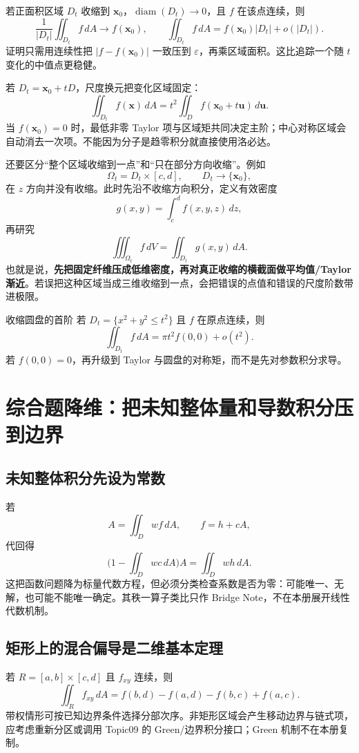 \documentclass[11pt,a4paper,fontset=fandol]{ctexart}
\begin{document}
若正面积区域 $D_t$ 收缩到 $\mathbf x_0$，$\operatorname{diam}(D_t)\to0$，且 $f$ 在该点连续，则
\[
\boxed{
\frac1{\lvert D_t\rvert}\iint_{D_t}f\,dA\to f(\mathbf x_0),
\qquad
\iint_{D_t}f\,dA=f(\mathbf x_0)\lvert D_t\rvert+o(\lvert D_t\rvert).}
\]
证明只需用连续性把 $\lvert f-f(\mathbf x_0)\rvert$ 一致压到 $\varepsilon$，再乘区域面积。这比追踪一个随 $t$ 变化的中值点更稳健。

若 $D_t=\mathbf x_0+tD$，尺度换元把变化区域固定：
\[
\iint_{D_t}f(\mathbf x)\,dA
=t^2\iint_D f(\mathbf x_0+t\mathbf u)\,d\mathbf u.
\]
当 $f(\mathbf x_0)=0$ 时，最低非零 Taylor 项与区域矩共同决定主阶；中心对称区域会自动消去一次项。不能因为分子是趋零积分就直接使用洛必达。

还要区分“整个区域收缩到一点”和“只在部分方向收缩”。例如
\[
\Omega_t=D_t\times[c,d],\qquad D_t\to\{\mathbf x_0\},
\]
在 $z$ 方向并没有收缩。此时先沿不收缩方向积分，定义有效密度
\[
g(x,y)=\int_c^d f(x,y,z)\,dz,
\]
再研究
\[
\iiint_{\Omega_t}f\,dV=\iint_{D_t}g(x,y)\,dA.
\]
也就是说，\textbf{先把固定纤维压成低维密度，再对真正收缩的横截面做平均值/Taylor 渐近}。若误把这种区域当成三维收缩到一点，会把错误的点值和错误的尺度阶数带进极限。

\begin{examplebox}{收缩圆盘的首阶}
若 $D_t=\{x^2+y^2\le t^2\}$ 且 $f$ 在原点连续，则
\[
\iint_{D_t}f\,dA=\pi t^2f(0,0)+o(t^2).
\]
若 $f(0,0)=0$，再升级到 Taylor 与圆盘的对称矩，而不是先对参数积分求导。
\end{examplebox}

\section{综合题降维：把未知整体量和导数积分压到边界}

\subsection{未知整体积分先设为常数}

若
\[
A=\iint_D wf\,dA,
\qquad f=h+cA,
\]
代回得
\[
\biggl(1-\iint_D wc\,dA\biggr)A=\iint_D wh\,dA.
\]
这把函数问题降为标量代数方程，但必须分类检查系数是否为零：可能唯一、无解，也可能不能唯一确定。其秩一算子类比只作 Bridge Note，不在本册展开线性代数机制。

\subsection{矩形上的混合偏导是二维基本定理}

若 $R=[a,b]\times[c,d]$ 且 $f_{xy}$ 连续，则
\[
\boxed{
\iint_R f_{xy}\,dA
=f(b,d)-f(a,d)-f(b,c)+f(a,c).}
\]
带权情形可按已知边界条件选择分部次序。非矩形区域会产生移动边界与链式项，应考虑重新分区或调用 Topic09 的 Green/边界积分接口；Green 机制不在本册复制。
\end{document}
